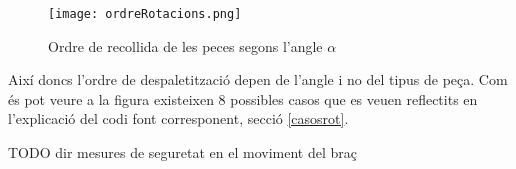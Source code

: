 \begin{figure}[H]
\begin{center}\label{fig:recpec}
 \texttt{[image: ordreRotacions.png]}
\end{center}
  \caption{Ordre de recollida de les peces segons l'angle $\alpha$}
\end{figure}

Així doncs l'ordre de despaletització depen de l'angle i no del tipus de peça.
Com és pot veure a la figura existeixen 8 possibles casos que es veuen
reflectits en l'explicació del codi font corresponent, secció \ref{casosrot}.

TODO dir mesures de seguretat en el moviment del braç